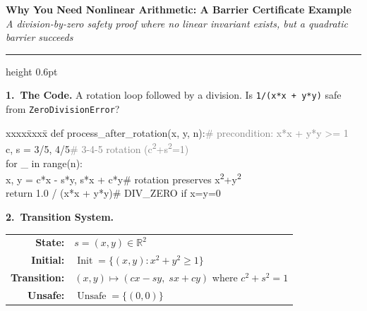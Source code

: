 \documentclass[10pt,a4paper]{article}
\newcommand{\Init}{\operatorname{Init}}
\newcommand{\Unsafe}{\operatorname{Unsafe}}
\begin{document}
\begin{center}
{\Large\bfseries Why You Need Nonlinear Arithmetic: A Barrier Certificate Example}\\[2pt]
{\small\itshape A division-by-zero safety proof where no linear invariant exists, but a quadratic barrier succeeds}
\end{center}

\vspace{-4pt}
\hrule height 0.6pt
\vspace{5pt}

\textbf{1.\ The Code.}\;
A rotation loop followed by a division.  Is \texttt{1/(x*x + y*y)} safe from \texttt{ZeroDivisionError}?

\vspace{-2pt}
{\small\ttfamily
\begin{tabbing}
xxxx\=xxxx\=\kill
def process\_after\_rotation(x, y, n):\hfill\textcolor{gray}{\# precondition: x*x + y*y >= 1}\\
\>c, s = 3/5, 4/5\hfill\textcolor{gray}{\# 3-4-5 rotation (c\textsuperscript{2}+s\textsuperscript{2}=1)}\\
\>for \_ in range(n):\\
\>\>x, y = c*x - s*y, s*x + c*y\hfill\textcolor{blue!60}{\# rotation preserves x\textsuperscript{2}+y\textsuperscript{2}}\\
\>return 1.0 / (x*x + y*y)\hfill\textcolor{red!70}{\# DIV\_ZERO if x=y=0}
\end{tabbing}}

\vspace{-4pt}
\textbf{2.\ Transition System.}

\vspace{1pt}
\begin{tabular}{@{}rl@{}}
\textbf{State:} & $s = (x, y) \in \mathbb{R}^2$ \\
\textbf{Initial:} & $\Init = \{(x,y) : x^2 + y^2 \geq 1\}$ \\
\textbf{Transition:} & $(x,y) \mapsto (cx - sy,\; sx + cy)$ \quad where $c^2 + s^2 = 1$ \\
\textbf{Unsafe:} & $\Unsafe = \{(0,0)\}$
\end{tabular}
\end{document}
